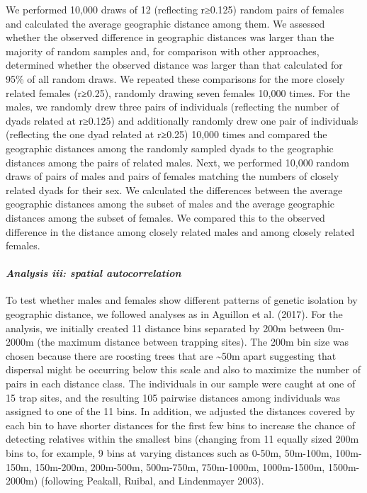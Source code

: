 \documentclass[]{article}
\let\oldparagraph\paragraph
\renewcommand{\paragraph}[1]{\oldparagraph{#1}\mbox{}}
\begin{document}
We performed 10,000 draws of 12 (reflecting r≥0.125) random pairs of
females and calculated the average geographic distance among them. We
assessed whether the observed difference in geographic distances was
larger than the majority of random samples and, for comparison with
other approaches, determined whether the observed distance was larger
than that calculated for 95\% of all random draws. We repeated these
comparisons for the more closely related females (r≥0.25), randomly
drawing seven females 10,000 times. For the males, we randomly drew
three pairs of individuals (reflecting the number of dyads related at
r≥0.125) and additionally randomly drew one pair of individuals
(reflecting the one dyad related at r≥0.25) 10,000 times and compared
the geographic distances among the randomly sampled dyads to the
geographic distances among the pairs of related males. Next, we
performed 10,000 random draws of pairs of males and pairs of females
matching the numbers of closely related dyads for their sex. We
calculated the differences between the average geographic distances
among the subset of males and the average geographic distances among the
subset of females. We compared this to the observed difference in the
distance among closely related males and among closely related females.

\hypertarget{analysis-iii-spatial-autocorrelation}{%
\paragraph{\texorpdfstring{\emph{Analysis iii: spatial
autocorrelation}}{Analysis iii: spatial autocorrelation}}\label{analysis-iii-spatial-autocorrelation}}

To test whether males and females show different patterns of genetic
isolation by geographic distance, we followed analyses as in Aguillon et
al. (2017). For the analysis, we initially created 11 distance bins
separated by 200m between 0m-2000m (the maximum distance between
trapping sites). The 200m bin size was chosen because there are roosting
trees that are \textasciitilde{}50m apart suggesting that dispersal
might be occurring below this scale and also to maximize the number of
pairs in each distance class. The individuals in our sample were caught
at one of 15 trap sites, and the resulting 105 pairwise distances among
individuals was assigned to one of the 11 bins. In addition, we adjusted
the distances covered by each bin to have shorter distances for the
first few bins to increase the chance of detecting relatives within the
smallest bins (changing from 11 equally sized 200m bins to, for example,
9 bins at varying distances such as 0-50m, 50m-100m, 100m-150m,
150m-200m, 200m-500m, 500m-750m, 750m-1000m, 1000m-1500m, 1500m-2000m)
(following Peakall, Ruibal, and Lindenmayer 2003).
\end{document}
